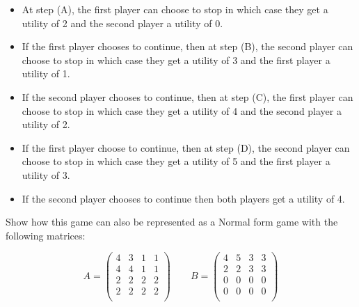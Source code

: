 \documentclass[12pt,a4paper]{article}
\begin{document}
\begin{enumerate}
\begin{enumerate}
            \begin{itemize}
                \item At step (A), the first player can choose to stop
            in which case they get a utility of 2 and the second player a
            utility of 0.
                \item If the first player chooses to continue, then at step (B), the
            second player can choose to stop in which case they get a utility of
            3 and the first player a utility of 1.
                \item If the second player chooses to continue,
            then at step (C), the first player can choose to stop in which case
            they get a utility of 4 and the second player a utility of 2.
                \item If the first player choose to continue, then at step (D),
                    the second player can choose to stop in which case they get
                    a utility of 5 and the first player a utility of 3.
                \item If the second player chooses to continue then both players
                    get a utility of 4.
            \end{itemize}

            Show how this game can also be represented as a Normal form game
            with the following matrices:

                \[A =
                         \begin{pmatrix}
                             4 & 3 & 1 & 1\\
                             4 & 4 & 1 & 1\\
                             2 & 2 & 2 & 2\\
                             2 & 2 & 2 & 2\\
                         \end{pmatrix}
                         \qquad
                         B =
                         \begin{pmatrix}
                             4 & 5 & 3 & 3\\
                             2 & 2 & 3 & 3\\
                             0 & 0 & 0 & 0\\
                             0 & 0 & 0 & 0\\
                         \end{pmatrix}
                  \]


\end{enumerate}
\end{enumerate}
\end{document}
